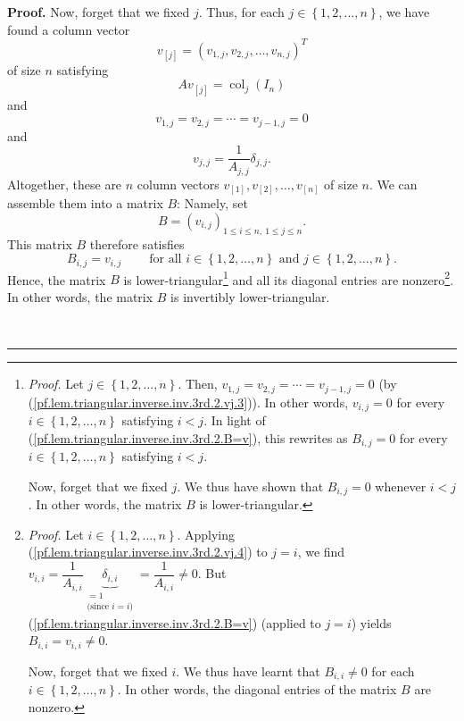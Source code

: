 \documentclass[numbers=enddot,12pt,final,onecolumn,notitlepage]{scrartcl}%
\theoremstyle{definition}
\newenvironment{proof}[1][Proof]{\noindent\textbf{#1.} }{\ \rule{0.5em}{0.5em}}
\begin{document}
\begin{proof}
Now, forget that we fixed $j$. Thus, for each $j\in\left\{  1,2,\ldots
,n\right\}  $, we have found a column vector
\begin{equation}
v_{\left[  j\right]  }=\left(  v_{1,j},v_{2,j},\ldots,v_{n,j}\right)  ^{T}
\label{pf.lem.triangular.inverse.inv.3rd.2.vj.1}%
\end{equation}
of size $n$ satisfying
\begin{equation}
Av_{\left[  j\right]  }=\operatorname*{col}\nolimits_{j}\left(  I_{n}\right)
\label{pf.lem.triangular.inverse.inv.3rd.2.vj.2}%
\end{equation}
and
\begin{equation}
v_{1,j}=v_{2,j}=\cdots=v_{j-1,j}=0
\label{pf.lem.triangular.inverse.inv.3rd.2.vj.3}%
\end{equation}
and
\begin{equation}
v_{j,j}=\dfrac{1}{A_{j,j}}\delta_{j,j}.
\label{pf.lem.triangular.inverse.inv.3rd.2.vj.4}%
\end{equation}
Altogether, these are $n$ column vectors $v_{\left[  1\right]  },v_{\left[
2\right]  },\ldots,v_{\left[  n\right]  }$ of size $n$. We can assemble them
into a matrix $B$: Namely, set
\[
B=\left(  v_{i,j}\right)  _{1\leq i\leq n,\ 1\leq j\leq n}.
\]
This matrix $B$ therefore satisfies%
\begin{equation}
B_{i,j}=v_{i,j}\ \ \ \ \ \ \ \ \ \ \text{for all }i\in\left\{  1,2,\ldots
,n\right\}  \text{ and }j\in\left\{  1,2,\ldots,n\right\}  .
\label{pf.lem.triangular.inverse.inv.3rd.2.B=v}%
\end{equation}
Hence, the matrix $B$ is lower-triangular\footnote{\textit{Proof.} Let
$j\in\left\{  1,2,\ldots,n\right\}  $. Then, $v_{1,j}=v_{2,j}=\cdots
=v_{j-1,j}=0$ (by (\ref{pf.lem.triangular.inverse.inv.3rd.2.vj.3})). In other
words, $v_{i,j}=0$ for every $i\in\left\{  1,2,\ldots,n\right\}  $ satisfying
$i<j$. In light of (\ref{pf.lem.triangular.inverse.inv.3rd.2.B=v}), this
rewrites as $B_{i,j}=0$ for every $i\in\left\{  1,2,\ldots,n\right\}  $
satisfying $i<j$.
\par
Now, forget that we fixed $j$. We thus have shown that $B_{i,j}=0$ whenever
$i<j$. In other words, the matrix $B$ is lower-triangular.} and all its
diagonal entries are nonzero\footnote{\textit{Proof.} Let $i\in\left\{
1,2,\ldots,n\right\}  $. Applying
(\ref{pf.lem.triangular.inverse.inv.3rd.2.vj.4}) to $j=i$, we find
$v_{i,i}=\dfrac{1}{A_{i,i}}\underbrace{\delta_{i,i}}%
_{\substack{=1\\\text{(since }i=i\text{)}}}=\dfrac{1}{A_{i,i}}\neq0$. But
(\ref{pf.lem.triangular.inverse.inv.3rd.2.B=v}) (applied to $j=i$) yields
$B_{i,i}=v_{i,i}\neq0$.
\par
Now, forget that we fixed $i$. We thus have learnt that $B_{i,i}\neq0$ for
each $i\in\left\{  1,2,\ldots,n\right\}  $. In other words, the diagonal
entries of the matrix $B$ are nonzero.}. In other words, the matrix $B$ is
invertibly lower-triangular.


\end{proof}
\end{document}
